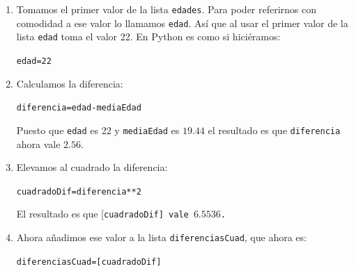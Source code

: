 \documentclass[10pt,a4paper]{article}\usepackage[]{graphicx}\usepackage[]{color}
\makeatletter
\newcommand{\hlnum}[1]{\textcolor[rgb]{0.686,0.059,0.569}{#1}}%
\newcommand{\hlopt}[1]{\textcolor[rgb]{0,0,0}{#1}}%
\newcommand{\hlstd}[1]{\textcolor[rgb]{0.345,0.345,0.345}{#1}}%
\newcommand{\hlkwb}[1]{\textcolor[rgb]{0.69,0.353,0.396}{#1}}%
\newenvironment{kframe}{%
 \def\at@end@of@kframe{}%
 \ifinner\ifhmode%
  \def\at@end@of@kframe{\end{minipage}}%
  \begin{minipage}{\columnwidth}%
 \fi\fi%
 \def\FrameCommand##1{\hskip\@totalleftmargin \hskip-\fboxsep
 \colorbox{shadecolor}{##1}\hskip-\fboxsep
     \hskip-\linewidth \hskip-\@totalleftmargin \hskip\columnwidth}%
 \MakeFramed {\advance\hsize-\width
   \@totalleftmargin\z@ \linewidth\hsize
   \@setminipage}}%
 {\par\unskip\endMakeFramed%
 \at@end@of@kframe}
\newenvironment{knitrout}{}{} %
\makeatother
\begin{document}
\begin{enumerate}
  \item Tomamos el primer valor de la lista {\tt edades}. Para poder referirnos con comodidad a ese valor lo llamamos {\tt edad}. Así que al usar el primer valor de la lista {\tt edad} toma el valor 22. En Python es como si hiciéramos:
\begin{knitrout}
\color{fgcolor}\begin{kframe}
\begin{alltt}
\hlstd{edad} \hlkwb{=}  \hlnum{22}
\end{alltt}
\end{kframe}
\end{knitrout}
  
  \item Calculamos la diferencia:
\begin{knitrout}
\color{fgcolor}\begin{kframe}
\begin{alltt}
\hlstd{diferencia} \hlkwb{=} \hlstd{edad} \hlopt{-} \hlstd{mediaEdad}
\end{alltt}
\end{kframe}
\end{knitrout}
Puesto que {\tt edad} es 22 y {\tt mediaEdad} es $19.44$ el resultado es que {\tt diferencia} ahora vale $2.56$.
  \item Elevamos al cuadrado la diferencia:
\begin{knitrout}
\color{fgcolor}\begin{kframe}
\begin{alltt}
\hlstd{cuadradoDif} \hlkwb{=} \hlstd{diferencia}\hlopt{**}\hlnum{2}
\end{alltt}
\end{kframe}
\end{knitrout}
El resultado es que [\tt cuadradoDif] vale $6.5536$. 
  \item Ahora añadimos ese valor a la lista {\tt diferenciasCuad}, que ahora es:
\begin{knitrout}
\color{fgcolor}\begin{kframe}
\begin{alltt}
diferenciasCuad = [cuadradoDif]
\end{alltt}
\end{kframe}
\end{knitrout}
\end{enumerate}
\end{document}
